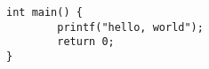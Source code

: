 \documentclass{article}
\begin{document}
\begin{verbatim}
int main() {
        printf("hello, world");
        return 0;
}
\end{verbatim}
\end{document}

